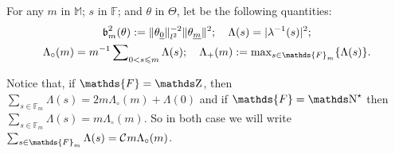 \begin{nota}
For any $m$ in $\mathds{M}$; $s$ in $\mathds{F}$; and $\theta$ in $\Theta$, let be the following quantities:
\begin{multline*}
\b_{m}^{2}(\theta) := \Vert \theta_{\underline{0}}\Vert_{l^{2}}^{-2} \Vert \theta_{\underline{m}} \Vert^{2}; \quad \Lambda(s) = \vert \lambda^{-1}(s) \vert^{2};\\
\Lambda_{\circ}(m) = m^{-1} \sum\nolimits_{0 < s \leq m} \Lambda(s); \quad \Lambda_{+}(m) := \max\nolimits_{s \in \mathds{F}_{m}}\{\Lambda(s)\}.
\end{multline*}
\assEnd
\end{nota}
Notice that, if $\mathds{F} = \Z$, then $\sum_{s \in \mathds{F}_{m}} \Lambda(s) = 2 m \Lambda_{\circ}(m) + \Lambda(0)$ and if $\mathds{F} = \N^{\star}$ then $\sum_{s \in \mathds{F}_{m}} \Lambda(s) = m \Lambda_{\circ}(m)$.
So in both case we will write $\sum_{s \in \mathds{F}_{m}} \Lambda(s) = \cst{} m \Lambda_{\circ}(m)$.

